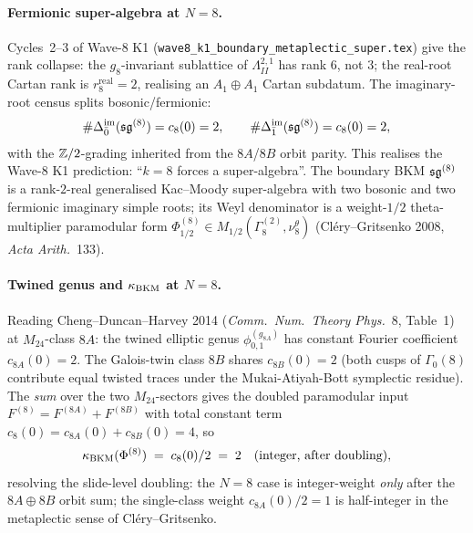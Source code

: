 \paragraph{Fermionic super-algebra at $N=8$.} Cycles~2--3 of Wave-8
K1 (\texttt{wave8\_k1\_boundary\_metaplectic\_super.tex}) give the
rank collapse: the $g_8$-invariant sublattice of $\Lambda^{2,1}_{II}$
has rank $6$, not $3$; the real-root Cartan rank is $r^{\mathrm{real}}_8=2$,
realising an $A_1\oplus A_1$ Cartan subdatum. The imaginary-root
census splits bosonic/fermionic:
\[
  \#\Delta^{\mathrm{im}}_{\bar 0}(\mathfrak{sg}^{(8)})
    = c_8(0) = 2, \qquad
  \#\Delta^{\mathrm{im}}_{\bar 1}(\mathfrak{sg}^{(8)})
    = c_8(0) = 2,
\]
with the $\mathbb{Z}/2$-grading inherited from the $8A$/$8B$ orbit parity.
This realises the Wave-8 K1 prediction: ``$k=8$ forces a
super-algebra''. The boundary BKM $\mathfrak{sg}^{(8)}$ is a rank-$2$-real
generalised Kac--Moody super-algebra with two bosonic and two
fermionic imaginary simple roots; its Weyl denominator is a
weight-$1/2$ theta-multiplier paramodular form
$\Phi^{(8)}_{1/2}\in M_{1/2}(\Gamma^{(2)}_8,\nu^{\theta}_8)$
(Cl\'ery--Gritsenko 2008, \emph{Acta Arith.}~133).

\paragraph{Twined genus and $\kappa_{\mathrm{BKM}}$ at $N=8$.} Reading
Cheng--Duncan--Harvey 2014 (\emph{Comm.\ Num.\ Theory Phys.}~8,
Table~1) at $M_{24}$-class $8A$: the twined elliptic genus
$\phi^{(g_{8A})}_{0,1}$ has constant Fourier coefficient
$c_{8A}(0)=2$. The Galois-twin class $8B$ shares
$c_{8B}(0)=2$ (both cusps of $\Gamma_0(8)$ contribute equal
twisted traces under the Mukai-Atiyah-Bott symplectic residue).
The \emph{sum} over the two $M_{24}$-sectors gives the doubled
paramodular input
$F^{(8)} = F^{(8A)} + F^{(8B)}$
with total constant term
$c_8(0) = c_{8A}(0)+c_{8B}(0) = 4$, so
\[
  \kappa_{\mathrm{BKM}}(\Phi^{(8)}) \;=\; c_8(0)/2 \;=\; 2
  \quad\text{(integer, after doubling)},
\]
resolving the slide-level doubling: the $N=8$ case is integer-weight
\emph{only} after the $8A\oplus 8B$ orbit sum; the single-class
weight $c_{8A}(0)/2=1$ is half-integer in the metaplectic sense
of Cl\'ery--Gritsenko.

